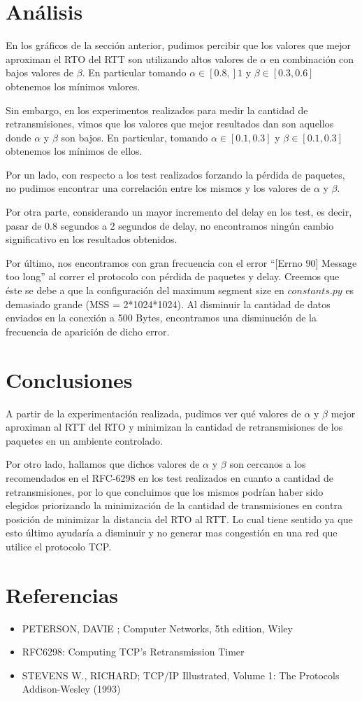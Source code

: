 \documentclass[10pt, a4paper]{article}
\begin{document}
\newpage
\section{Análisis}
En los gráficos de la sección anterior, pudimos percibir que los valores que mejor aproximan el RTO del RTT son utilizando altos valores de $\alpha$ en combinación con bajos valores de $\beta$. En particular tomando $ \alpha \in [0.8,]1$ y $ \beta \in [0.3,0.6]$ obtenemos los mínimos valores. 

Sin embargo, en los experimentos realizados para medir la cantidad de retransmisiones, vimos que los valores que mejor resultados dan son aquellos donde $\alpha$ y $\beta$ son bajos. En particular, tomando $\alpha \in [0.1,0.3]$ y $\beta \in [0.1,0.3]$ obtenemos los mínimos de ellos.

Por un lado, con respecto a los test realizados forzando la pérdida de paquetes, no pudimos encontrar una correlación entre los mismos y los valores de $\alpha$ y $\beta$.

Por otra parte, considerando un mayor incremento del delay en los test, es decir, pasar de 0.8 segundos a 2 segundos de delay, no encontramos ningún cambio significativo en los resultados obtenidos.

Por último, nos encontramos con gran frecuencia con el error ``[Errno 90] Message too long'' al correr el protocolo con pérdida de paquetes y delay. Creemos que éste se debe a que la configuración del maximum segment size en $constants.py$ es demasiado grande (MSS = 2*1024*1024). Al disminuir la cantidad de datos enviados en la conexión a 500 Bytes, encontramos una disminución de la frecuencia de aparición de dicho error.

\newpage
\section{Conclusiones}
A partir de la experimentación realizada, pudimos ver qué valores de $\alpha$ y $\beta$ mejor aproximan al RTT del RTO y minimizan la cantidad de retransmisiones de los paquetes en un ambiente controlado.

Por otro lado, hallamos que dichos valores de $\alpha$ y $\beta$ son cercanos a los recomendados en el RFC-6298 en los test realizados en cuanto a cantidad de retransmisiones, por lo que concluimos que los mismos podrían haber sido elegidos priorizando la minimización de la cantidad de transmisiones en contra posición de minimizar la distancia del RTO al RTT. Lo cual tiene sentido ya que esto último ayudaría a disminuir y no generar mas congestión en una red que utilice el protocolo TCP.

\section{Referencias}
\begin{itemize}
\item PETERSON, DAVIE ; Computer Networks, 5th edition, Wiley

\item{RFC6298: Computing TCP's Retransmission Timer}

\item{STEVENS W., RICHARD; TCP/IP Illustrated, Volume 1: The Protocols Addison-Wesley (1993)}

\end{itemize}
\end{document}
